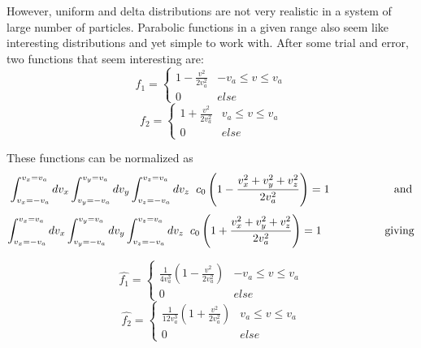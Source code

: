\documentclass[12pt]{article}
\begin{document}
{	\noindent However, uniform and delta distributions are not very realistic in a system of large number of particles. Parabolic functions in a given range also seem like interesting distributions and yet simple to work with. After some trial and error, two functions that seem interesting are:
	\[ f_{1} = 
	\begin{cases} 
		1- \frac{v^{2}}{2 v_{a}^2} & -v_{a}\leq v\leq v_{a} \\
		0 & else 
	\end{cases}
	\]
	\[ f_{2} = 
	\begin{cases}
		1 + \frac{v^{2}}{2 v_{a}^2} & v_{a}\leq v\leq v_{a} \\
		0 & else
	\end{cases}\]  
	
	These functions can be normalized as
	$$ \int_{v_{x} = -v_{a}}^{v_{x} = v_{a}} dv_{x} \int_{v_{y} = -v_{a}}^{v_{y} = v_{a}} dv_{y} \int_{v_{z} = -v_{a}}^{v_{z} = v_{a}} dv_{z} \hspace{0.2cm}c_{0}  \left(1 - \frac{v_{x}^{2}+v_{y}^{2}+v_{z}^{2}}{2 v_{a}^2}\right) = 1 \hspace{2cm} \mathrm{and}$$
	$$ \int_{v_{x} = -v_{a}}^{v_{x} = v_{a}} dv_{x} \int_{v_{y} = -v_{a}}^{v_{y} = v_{a}} dv_{y} \int_{v_{z} = -v_{a}}^{v_{z} = v_{a}} dv_{z} \hspace{0.2cm} c_{0}  \left(1 + \frac{v_{x}^{2}+v_{y}^{2}+v_{z}^{2}}{2 v_{a}^2}\right) = 1 \hspace{2cm} \mathrm{giving}$$
	
	\[ \hat{f_{1}} = 
	\begin{cases} 
		\frac{1}{4 v_{a}^{3}} \left(1 - \frac{v^{2}}{2 v_{a}^2}\right) & -v_{a}\leq v\leq v_{a} \\
		0 & else 
	\end{cases}
	\]
	\[ \hat{f_{2}} = 
	\begin{cases}
		\frac{1}{12 v_{a}^{3}} \left(1 + \frac{v^{2}}{2 v_{a}^2}\right) & v_{a}\leq v\leq v_{a} \\
		0 & else
	\end{cases}\] 
	
}
\end{document}
